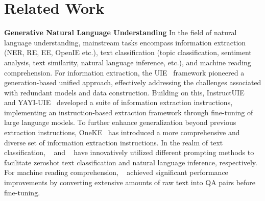 \section{Related Work}
\noindent \textbf{Generative Natural Language Understanding}
In the field of natural language understanding, mainstream tasks encompass information extraction (NER, RE, EE, OpenIE etc.), text classification (topic classification, sentiment analysis, text similarity, natural language inference, etc.), and machine reading comprehension.
For information extraction, the UIE~\cite{DBLP:UIE} framework pioneered a generation-based unified approach, effectively addressing the challenges associated with redundant models and data construction. Building on this, InstructUIE~\cite{DBLP:InstructUIE} and YAYI-UIE~\cite{DBLP:yayiuie} developed a suite of information extraction instructions, implementing an instruction-based extraction framework through fine-tuning of large language models. To further enhance generalization beyond previous extraction instructions, OneKE~\cite{DBLP:OneKE} has introduced a more comprehensive and diverse set of information extraction instructions.
In the realm of text classification, ~\citet{DBLP:zeroshotTC} and ~\citet{DBLP:GARP} have innovatively utilized different prompting methods to facilitate zeroshot text classification and natural language inference, respectively. For machine reading comprehension, ~\citet{DBLP:AdaptLLM} achieved significant performance improvements by converting extensive amounts of raw text into QA pairs before fine-tuning.

